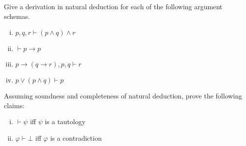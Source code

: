 \documentclass[nobib,nofonts]{tufte-handout}
\begin{document}
\bigskip
\noindent \colorbox{mygray}{\centering
  \begin{minipage}{1.0\textwidth}

    \begin{exercise}
      Give a derivation in natural deduction for each of the following argument schemas.
      \begin{enumerate}[(i)]
        \item $p, q, r \vdash (p \wedge q) \wedge r$
        \item $\vdash p \rightarrow p$
        \item $p \rightarrow (q \rightarrow r), p, q \vdash r$
        \item $p \vee (p \wedge q) \vdash p$
      \end{enumerate}
    \end{exercise}

    \begin{exercise}
      Assuming soundness and completeness of natural deduction, prove the following claims:
      \begin{enumerate}[(i)]
        \item $\vdash \psi$ iff $\psi$ is a tautology
        \item $\varphi \vdash \bot$ iff $\varphi$ is a contradiction
      \end{enumerate}
    \end{exercise}
  \end{minipage}

}
\end{document}
